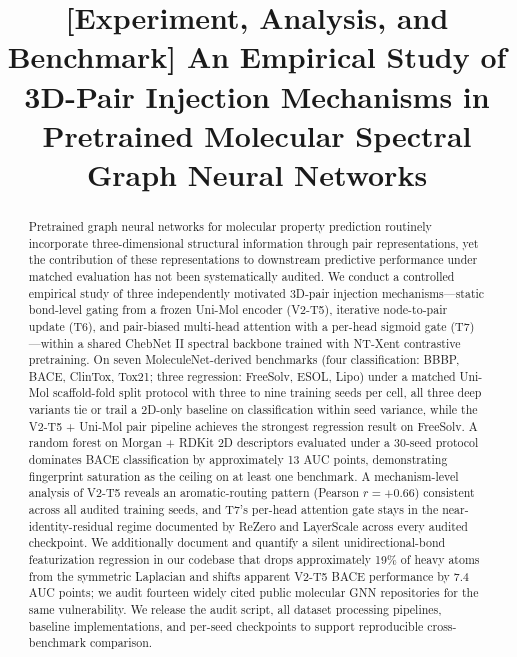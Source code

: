 %

\title{[Experiment, Analysis, and Benchmark] An Empirical Study of 3D-Pair Injection
Mechanisms in Pretrained Molecular Spectral Graph Neural Networks}


\begin{abstract}
Pretrained graph neural networks for molecular property prediction
routinely incorporate three-dimensional structural information through
pair representations, yet the contribution of these representations to
downstream predictive performance under matched evaluation has not been
systematically audited. We conduct a controlled empirical study of three
independently motivated 3D-pair injection mechanisms---static bond-level
gating from a frozen Uni-Mol encoder (V2-T5), iterative node-to-pair
update (T6), and pair-biased multi-head attention with a per-head sigmoid
gate (T7)---within a shared ChebNet II spectral backbone trained with
NT-Xent contrastive pretraining. On seven MoleculeNet-derived benchmarks
(four classification: BBBP, BACE, ClinTox, Tox21; three regression:
FreeSolv, ESOL, Lipo) under a matched Uni-Mol scaffold-fold split protocol
with three to nine training seeds per cell, all three deep variants tie
or trail a 2D-only baseline on classification within seed variance, while
the V2-T5 + Uni-Mol pair pipeline achieves the strongest regression result
on FreeSolv. A random forest on Morgan + RDKit 2D descriptors evaluated
under a 30-seed protocol dominates BACE classification by approximately
13 AUC points, demonstrating fingerprint saturation as the ceiling on at
least one benchmark. A mechanism-level analysis of V2-T5 reveals an
aromatic-routing pattern (Pearson \( r = {+}0.66 \)) consistent across all
audited training seeds, and T7's per-head attention gate stays in the
near-identity-residual regime documented by ReZero and LayerScale across
every audited checkpoint. We additionally document and quantify a
silent unidirectional-bond featurization regression in our codebase that
drops approximately 19\% of heavy atoms from the symmetric Laplacian and
shifts apparent V2-T5 BACE performance by 7.4 AUC points; we audit
fourteen widely cited public molecular GNN repositories for the same
vulnerability. We release the audit script, all dataset processing
pipelines, baseline implementations, and per-seed checkpoints to support
reproducible cross-benchmark comparison.
\end{abstract}

